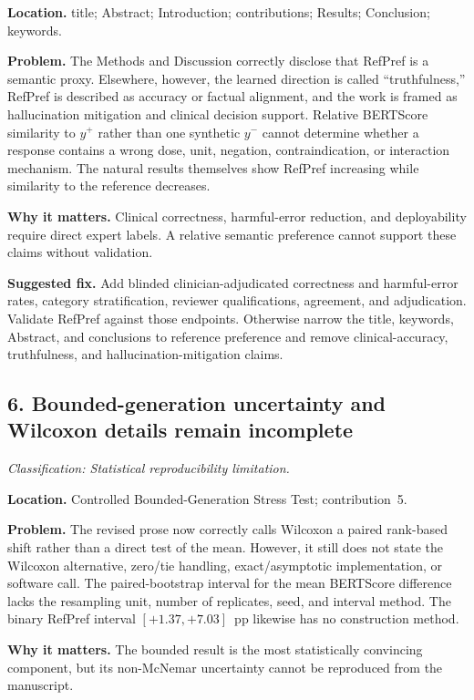 \documentclass[11pt]{article}
\newcommand{\findinglabel}[1]{\textbf{#1}}
\newcommand{\classification}[1]{\textit{Classification: #1.}}
\begin{document}
\findinglabel{Location.} title; Abstract; Introduction; contributions; Results; Conclusion; keywords.

\findinglabel{Problem.} The Methods and Discussion correctly disclose that RefPref is a semantic proxy.  Elsewhere, however, the learned direction is called ``truthfulness,'' RefPref is described as accuracy or factual alignment, and the work is framed as hallucination mitigation and clinical decision support.  Relative BERTScore similarity to $y^+$ rather than one synthetic $y^-$ cannot determine whether a response contains a wrong dose, unit, negation, contraindication, or interaction mechanism.  The natural results themselves show RefPref increasing while similarity to the reference decreases.

\findinglabel{Why it matters.} Clinical correctness, harmful-error reduction, and deployability require direct expert labels.  A relative semantic preference cannot support these claims without validation.

\findinglabel{Suggested fix.} Add blinded clinician-adjudicated correctness and harmful-error rates, category stratification, reviewer qualifications, agreement, and adjudication.  Validate RefPref against those endpoints.  Otherwise narrow the title, keywords, Abstract, and conclusions to reference preference and remove clinical-accuracy, truthfulness, and hallucination-mitigation claims.

\subsection*{6. Bounded-generation uncertainty and Wilcoxon details remain incomplete}

\classification{Statistical reproducibility limitation}

\findinglabel{Location.} Controlled Bounded-Generation Stress Test; contribution~5.

\findinglabel{Problem.} The revised prose now correctly calls Wilcoxon a paired rank-based shift rather than a direct test of the mean.  However, it still does not state the Wilcoxon alternative, zero/tie handling, exact/asymptotic implementation, or software call.  The paired-bootstrap interval for the mean BERTScore difference lacks the resampling unit, number of replicates, seed, and interval method.  The binary RefPref interval $[+1.37,+7.03]$~pp likewise has no construction method.

\findinglabel{Why it matters.} The bounded result is the most statistically convincing component, but its non-McNemar uncertainty cannot be reproduced from the manuscript.
\end{document}

